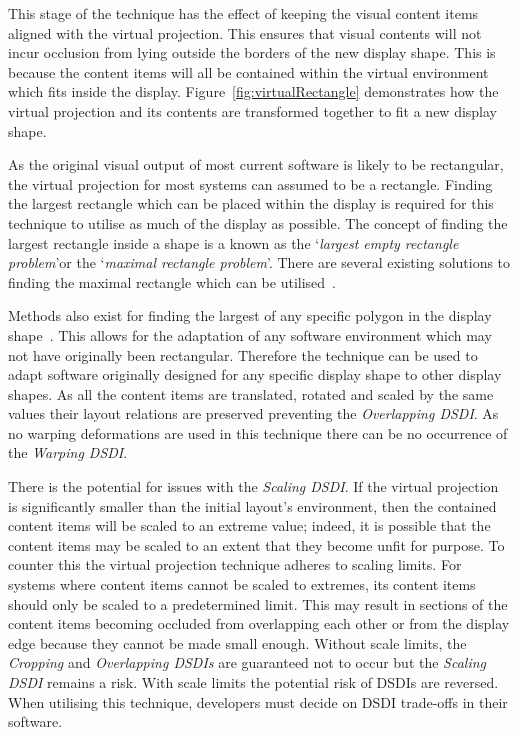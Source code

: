 \documentclass{bmcart}
\begin{document}
This stage of the technique has the effect of keeping the visual content items aligned with the virtual projection.
This ensures that visual contents will not incur occlusion from lying outside the borders of the new display shape.
This is because the content items will all be contained within the virtual environment which fits inside the display.
Figure~\ref{fig:virtualRectangle} demonstrates how the virtual projection and its contents are transformed together to fit a new display shape.

As the original visual output of most current software is likely to be rectangular, the virtual projection for most systems can assumed to be a rectangle.
Finding the largest rectangle which can be placed within the display is required for this technique to utilise as much of the display as possible.
The concept of finding the largest rectangle inside a shape is a known as the \lq {\emph{largest empty rectangle problem}}\rq or the \lq {\emph{maximal rectangle problem}}\rq .
There are several existing solutions to finding the maximal rectangle which can be utilised~\cite{Aggarwal1987,Naamad1984}.

Methods also exist for finding the largest of any specific polygon in the display shape~\cite{Toussaint1983}.
This allows for the adaptation of any software environment which may not have originally been rectangular.
Therefore the technique can be used to adapt software originally designed for any specific display shape to other display shapes.
As all the content items are translated, rotated and scaled by the same values their layout relations are preserved preventing the {\emph{Overlapping \ac{DSDI}}}.
As no warping deformations are used in this technique there can be no occurrence of the {\emph{Warping \ac{DSDI}}}.

There is the potential for issues with the {\emph{Scaling \ac{DSDI}}}.
If the virtual projection is significantly smaller than the initial
layout's environment, then the contained content items will be scaled to an extreme value; indeed, it is possible that the content items may be scaled to an extent that they become unfit for purpose.
To counter this the virtual projection technique adheres to scaling limits.
For systems where content items cannot be scaled to extremes, its content items should only be scaled to a predetermined limit.
This may result in sections of the content items becoming occluded from overlapping each other or from the display edge because they cannot be made small enough.
Without scale limits, the {\emph{Cropping}} and {\emph{Overlapping \acp{DSDI}}} are guaranteed not to occur but the {\emph{Scaling \ac{DSDI}}} remains a risk.
With scale limits the potential risk of \acp{DSDI} are reversed.
When utilising this technique, developers must decide on \ac{DSDI} trade-offs in their software.
\end{document}
